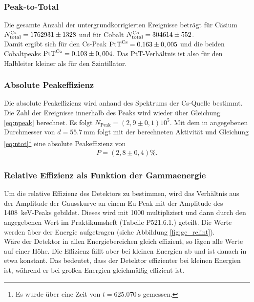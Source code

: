 \subsubsection*{Peak-to-Total}
Die gesamte Anzahl der untergrundkorrigierten Ereignisse beträgt für Cäsium $N_\mathrm{total}^\mathrm{Cs} = 1762931 \pm 1328$ und für Cobalt $N_\mathrm{total}^\mathrm{Co} = 304614\pm 552$.\\
Damit ergibt sich für den Cs-Peak $\text{PtT}^\mathrm{Cs} = 0.163\pm 0,005$ und die beiden Cobaltpeaks $\text{PtT}^\mathrm{Co} = 0.103\pm 0,004$. Das PtT-Verhältnis ist also für den Halbleiter kleiner als für den Szintillator.

\subsubsection*{Absolute Peakeffizienz}
Die absolute Peakeffizienz wird anhand des Spektrums der Cs-Quelle bestimmt. Die Zahl der Ereignisse innerhalb des Peaks wird wieder über Gleichung \ref{eq:npeak} berechnet. Es folgt $N_\mathrm{Peak}=(2,9 \pm 0,1)10^5$. Mit dem in \cite{praktikumsheft} angegebenen Durchmesser von $d=\SI{55.7}{\milli\metre}$ folgt mit der berechneten Aktivität und Gleichung \ref{eq:ntot}\footnote{Es wurde über eine Zeit von $t=\SI{625.070}{\second}$ gemessen.} eine absolute Peakeffizienz von
\begin{align*}
  P=(2,8 \pm 0,4)\%.
\end{align*}

\subsubsection*{Relative Effizienz als Funktion der Gammaenergie}
Um die relative Effizienz des Detektors zu bestimmen, wird das Verhältnis aus der Amplitude der Gausskurve an einem Eu-Peak mit der Amplitude des \SI{1408}{keV}-Peaks gebildet. Dieses wird mit 1000 multipliziert und dann durch den angegebenen Wert im Praktikumsheft \cite{praktikumsheft} (Tabelle P521.6.1.) geteilt. Die Werte werden über der Energie aufgetragen (siehe Abbildung \ref{fig:ge_relint}). \\

Wäre der Detektor in allen Energiebereichen gleich effizient, so lägen alle Werte auf einer Höhe. Die Effizienz fällt aber bei kleinen Energien ab und ist danach in etwa konstant. Das bedeutet, dass der Detektor effizienter bei kleinen Energien ist, während er bei großen Energien gleichmäßig effizient ist.

